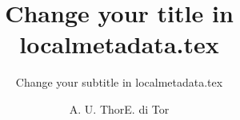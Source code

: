 \renewcommand{\lsSeries}{sidl}
\renewcommand{\lsSeriesNumber}{??}

\title{Change your title in localmetadata.tex}
\subtitle{Change your subtitle in localmetadata.tex}
\author{A. U. Thor\lastand E. di Tor}
